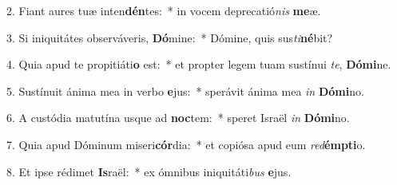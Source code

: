 2. Fiant aures tuæ inten\textbf{dén}tes:~*  in vocem deprecatió\textit{nis} \textbf{me}æ.\

3. Si iniquitátes observáveris, \textbf{Dó}mine:~*  Dómine, quis sus\textit{ti}\textbf{né}bit?\

4. Quia apud te propitiáti\textbf{o} est:~*  et propter legem tuam sustínui \textit{te}, \textbf{Dó}\textbf{mi}ne.\

5. Sustínuit ánima mea in verbo \textbf{e}jus:~*  sperávit ánima mea \textit{in} \textbf{Dó}\textbf{mi}no.\

6. A custódia matutína usque ad \textbf{noc}tem:~*  speret Israël \textit{in} \textbf{Dó}\textbf{mi}no.\

7. Quia apud Dóminum miseri\textbf{cór}dia:~*  et copiósa apud eum \textit{red}\textbf{émp}\textbf{ti}o.\

8. Et ipse rédimet \textbf{Is}raël:~*  ex ómnibus iniquitáti\textit{bus} \textbf{e}jus.\

